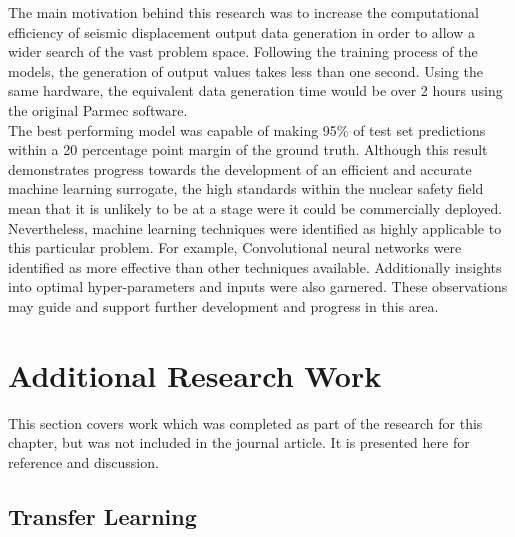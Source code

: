 \noindent
The main motivation behind this research was to increase the computational efficiency of seismic displacement output data generation in order to allow a wider search of the vast problem space. Following the training process of the models, the generation of output values takes less than one second. Using the same hardware, the equivalent data generation time would be over 2 hours using the original Parmec software.
\\

\noindent
The best performing model was capable of making 95\% of test set predictions within a 20 percentage point margin of the ground truth. Although this result demonstrates progress towards the development of an efficient and accurate machine learning surrogate, the high standards within the nuclear safety field mean that it is unlikely to be at a stage were it could be commercially deployed. Nevertheless, machine learning techniques were identified as highly applicable to this particular problem. For example, Convolutional neural networks were identified as more effective than other techniques available. Additionally insights into optimal hyper-parameters and inputs were also garnered. These observations may guide and support further development and progress in this area.

\section{Additional Research Work}

This section covers work which was completed as part of the research for this chapter, but was not included in the journal article. It is presented here for reference and discussion.

\subsection{Transfer Learning}

    
